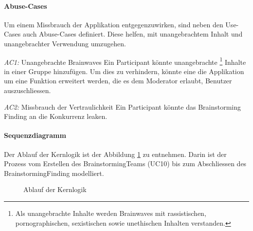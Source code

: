 \paragraph{Abuse-Cases}
Um einem Missbrauch der Applikation entgegenzuwirken, sind neben den Use-Cases auch Abuse-Cases definiert. Diese helfen, mit unangebrachtem Inhalt und unangebrachter Verwendung umzugehen.
\begin{basedescript}{%
		\desclabelstyle{\multilinelabel}
		\desclabelwidth{4.5cm}}
	\item[\textit{AC1: }Unangebrachte Brainwaves] Ein Participant könnte unangebrachte \footnote{Als unangebrachte Inhalte werden Brainwaves mit rassistischen, pornographischen, sexistischen sowie unethischen Inhalten verstanden.} Inhalte in einer Gruppe hinzufügen. Um dies zu verhindern, könnte eine die Applikation um eine Funktion erweitert werden, die es dem Moderator erlaubt, Benutzer auszuschliessen.
	
	\item[\textit{AC2: }Missbrauch der Vertraulichkeit] Ein Participant könnte das Brainstorming Finding an die Konkurrenz leaken. 
\end{basedescript}

\paragraph{Sequenzdiagramm}
Der Ablauf der Kernlogik ist der Abbildung \ref{fig:seq-methode635} zu entnehmen. Darin ist der Prozess vom Erstellen des BrainstormingTeams (UC10) bis zum Abschliessen des BrainstormingFinding modelliert.
\begin{figure}[h]
	\centering
	\caption{Ablauf der Kernlogik}
	\label{fig:seq-methode635}
\end{figure}


